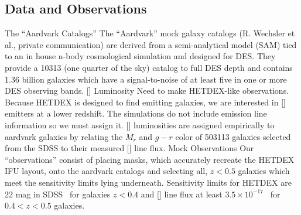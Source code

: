 \documentclass[12pt]{article}
\begin{document}
\subsection{Data and Observations}
\begin{outline}[enumerate]
	\1 The ``Aardvark Catalogs''
		\2 The ``Aardvark'' mock galaxy catalogs (R. Wechsler et al., private communication) are derived from a semi-analytical model (SAM) tied to an in house n-body cosmological simulation and designed for DES. They provide a 10313 \degsq (one quarter of the sky) catalog to full DES depth and contains 1.36 billion galaxies which have a signal-to-noise of at least five in one or more DES observing bands.
	\1 {\rm[]} Luminosity
		\2 Need to make HETDEX-like observations. Because HETDEX is designed to find \lya emitting galaxies, we are interested in [] emitters at a lower redshift. The simulations do not include emission line information so we must assign it. 
		\2 {\rm[]} luminosities are assigned empirically to aardvark galaxies by relating the $M_r$ and $g-r$ color of 503113 galaxies selected from the SDSS to their measured [] line flux.
	\1 Mock Observations
		\2 Our ``observations'' consist of placing masks, which accurately recreate the HETDEX IFU layout, onto the aardvark catalogs and selecting all, $z< 0.5$ galaxies which meet the sensitivity limits lying underneath.
		\2 Sensitivity limits for HETDEX are 22 mag in SDSS \sdssg\ for galaxies $z<0.4$ and [] line flux at least $3.5\times10^{-17}$ \ergscm\ for $0.4<z<0.5$ galaxies.
\end{outline}
\end{document}
